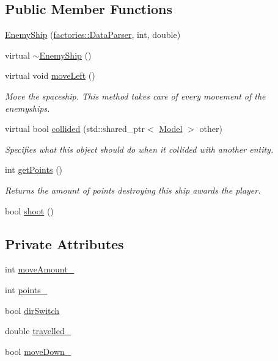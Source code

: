 \subsection*{\-Public \-Member \-Functions}
\begin{DoxyCompactItemize}
\item 
\hyperlink{classmodels_1_1EnemyShip_a80ebc0b6a1e58ab2f963f087786dcd8f}{\-Enemy\-Ship} (\hyperlink{classfactories_1_1DataParser}{factories\-::\-Data\-Parser}, int, double)
\item 
virtual \hyperlink{classmodels_1_1EnemyShip_a17c83db2f35e566465f75a78ead3b444}{$\sim$\-Enemy\-Ship} ()
\item 
virtual void \hyperlink{classmodels_1_1EnemyShip_a858923dce4ae65652ed4513d5da9fb1d}{move\-Left} ()
\begin{DoxyCompactList}\small\item\em \-Move the spaceship. \-This method takes care of every movement of the enemyships. \end{DoxyCompactList}\item 
virtual bool \hyperlink{classmodels_1_1EnemyShip_a25d00521cb35008d405cb9e1300eb9ae}{collided} (std\-::shared\-\_\-ptr$<$ \hyperlink{classmodels_1_1Model}{\-Model} $>$ other)
\begin{DoxyCompactList}\small\item\em \-Specifies what this object should do when it collided with another entity. \end{DoxyCompactList}\item 
int \hyperlink{classmodels_1_1EnemyShip_a2e431ef058cc7ba92da1ab4d349a884d}{get\-Points} ()
\begin{DoxyCompactList}\small\item\em \-Returns the amount of points destroying this ship awards the player. \end{DoxyCompactList}\item 
bool \hyperlink{classmodels_1_1EnemyShip_aa25f4cfb211186150ac3b229722b07ae}{shoot} ()
\end{DoxyCompactItemize}
\subsection*{\-Private \-Attributes}
\begin{DoxyCompactItemize}
\item 
int \hyperlink{classmodels_1_1EnemyShip_a5e303de4f6d0e728d8610b75732a83f4}{move\-Amount\-\_\-}
\item 
int \hyperlink{classmodels_1_1EnemyShip_ae281306bb3d1401e513a1b3bbef5a61b}{points\-\_\-}
\item 
bool \hyperlink{classmodels_1_1EnemyShip_aff3aa6732d42716ab66fff75e4fe541b}{dir\-Switch}
\item 
double \hyperlink{classmodels_1_1EnemyShip_a2d95522beb6de8ac6d24fd1dd49969ed}{travelled\-\_\-}
\item 
bool \hyperlink{classmodels_1_1EnemyShip_ae53fe129fa8a1b4a083844091838e5e1}{move\-Down\-\_\-}
\end{DoxyCompactItemize}


